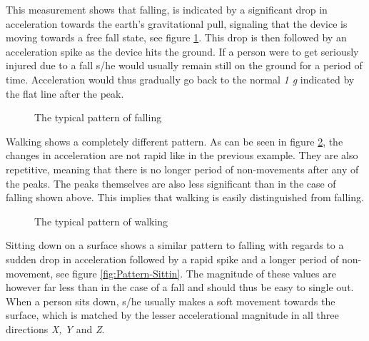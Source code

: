 \documentclass[12pt, a4paper, onecolumn]{article}
\begin{document}
	This measurement shows that falling, is indicated by a significant drop in acceleration towards the earth's gravitational pull, signaling that the device is moving towards a free fall state, see figure \ref{fig:Pattern-Falling}. This drop is then followed by an acceleration spike as the device hits the ground. If a person were to get seriously injured due to a fall s/he would usually remain still on the ground for a period of time. Acceleration would thus gradually go back to the normal \textit{1 g} indicated by the flat line after the peak. 
	
	\begin{figure}[H]
		\centering
		\caption{The typical pattern of falling}%
		\label{fig:Pattern-Falling}%
	\end{figure}
	
	
	Walking shows a completely different pattern. As can be seen in figure \ref{fig:Pattern-Walking}, the changes in acceleration are not rapid like in the previous example. They are also repetitive, meaning that there is no longer period of non-movements after any of the peaks. The peaks themselves are also less significant than in the case of falling shown above. This implies that walking is easily distinguished from falling.
	
	\begin{figure}[H]
		\centering
		\caption{The typical pattern of walking}%
		\label{fig:Pattern-Walking}%
	\end{figure}
	
	
	Sitting down on a surface shows a similar pattern to falling with regards to a sudden drop in acceleration followed by a rapid spike and a longer period of non-movement, see figure \ref{fig:Pattern-Sittin}. The magnitude of these values are however far less than in the case of a fall and should thus be easy to single out. When a person sits down, s/he usually makes a soft movement towards the surface, which is matched by the lesser accelerational magnitude in all three directions \textit{X, Y} and \textit{Z}.
	
\end{document}
